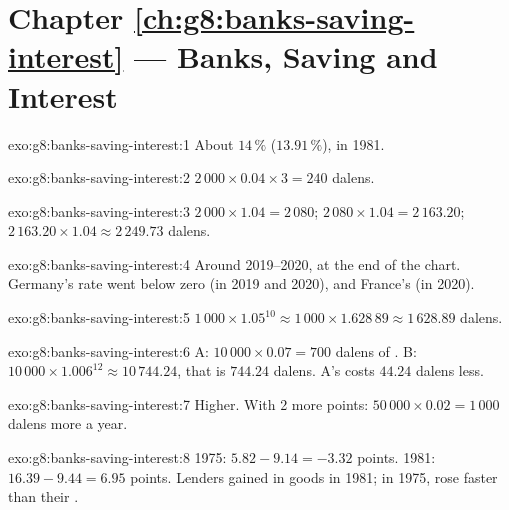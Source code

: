 \section*{Chapter \ref{ch:g8:banks-saving-interest} --- Banks, Saving and Interest}

\begin{solution}{exo:g8:banks-saving-interest:1}
About $14\,\%$ ($13.91\,\%$), in 1981.
\end{solution}

\begin{solution}{exo:g8:banks-saving-interest:2}
$2\,000 \times 0.04 \times 3 = 240$ dalens.
\end{solution}

\begin{solution}{exo:g8:banks-saving-interest:3}
$2\,000 \times 1.04 = 2\,080$; $2\,080 \times 1.04 = 2\,163.20$; $2\,163.20 \times 1.04 \approx
2\,249.73$ dalens.
\end{solution}

\begin{solution}{exo:g8:banks-saving-interest:4}
Around 2019--2020, at the end of the chart. Germany's rate went below zero (in 2019 and 2020), and
France's (in 2020).
\end{solution}

\begin{solution}{exo:g8:banks-saving-interest:5}
$1\,000 \times 1.05^{10} \approx 1\,000 \times 1.628\,89 \approx 1\,628.89$ dalens.
\end{solution}

\begin{solution}{exo:g8:banks-saving-interest:6}
 A: $10\,000 \times 0.07 = 700$ dalens of .  B: $10\,000 \times 1.006^{12} \approx
10\,744.24$, that is $744.24$ dalens.  A's  costs $44.24$ dalens less.
\end{solution}

\begin{solution}{exo:g8:banks-saving-interest:7}
Higher. With 2 more points: $50\,000 \times 0.02 = 1\,000$ dalens more  a year.
\end{solution}

\begin{solution}{exo:g8:banks-saving-interest:8}
1975: $5.82 - 9.14 = -3.32$ points. 1981: $16.39 - 9.44 = 6.95$ points. Lenders gained in goods in
1981; in 1975,  rose faster than their .
\end{solution}

